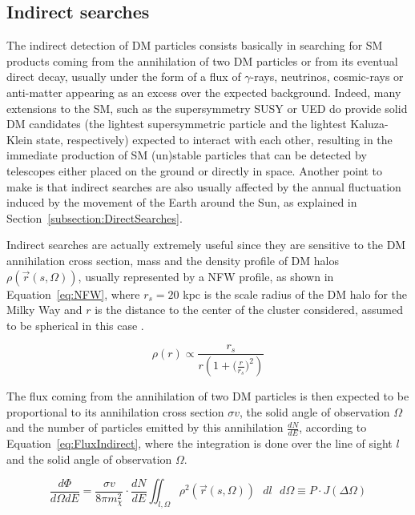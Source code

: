 \documentclass[a4paper, 10pt, openright]{report}
\begin{document}
\subsection{Indirect searches}

The indirect detection of \ac{DM} particles consists basically in searching for \ac{SM} products coming from the annihilation of two \ac{DM} particles or from its eventual direct decay, usually under the form of a flux of $\gamma$-rays, neutrinos, cosmic-rays or anti-matter appearing as an excess over the expected background. Indeed, many extensions to the \ac{SM}, such as the supersymmetry SUSY or \ac{UED} do provide solid \ac{DM} candidates (the lightest supersymmetric particle and the lightest Kaluza-Klein state, respectively) expected to interact with each other, resulting in the immediate production of \ac{SM} (un)stable particles that can be detected by telescopes either placed on the ground or directly in space. Another point to make is that indirect searches are also usually affected by the annual fluctuation induced by the movement of the Earth around the Sun, as explained in Section~\ref{subsection:DirectSearches}.

Indirect searches are actually extremely useful since they are sensitive to the \ac{DM} annihilation cross section, mass and the density profile of \ac{DM} halos $\rho(\overrightarrow{r}(s, \Omega))$, usually represented by a \ac{NFW} profile, as shown in Equation~\ref{eq:NFW}, where $r_s = 20$ kpc is the scale radius of the \ac{DM} halo for the Milky Way and $r$ is the distance to the center of the cluster considered, assumed to be spherical in this case \cite{FluxIndirect}.

\begin{equation}
\label{eq:NFW}
\rho(r) \propto \frac{r_s}{r \left (1+\big (\frac{r}{r_s} \big)^2 \right )}
\end{equation} 

The flux coming from the annihilation of two \ac{DM} particles is then expected to be proportional to its annihilation cross section $\sigma v$, the solid angle of observation $\Omega$ and the number of particles emitted by this annihilation $\frac{dN}{dE}$, according to Equation~\ref{eq:FluxIndirect}, where the integration is done over the line of sight $l$ and the solid angle of observation $\Omega$.

\begin{equation}
\label{eq:FluxIndirect}
\frac{d \Phi}{d\Omega dE} = \frac{\sigma v}{8 \pi m_\chi^2} \cdot \frac{dN}{dE} \iint_{l, \Omega} \rho^2(\overrightarrow{r}(s, \Omega)) \text{ } dl \text{ } d\Omega \equiv P \cdot J(\Delta \Omega)
\end{equation} 
\end{document}
